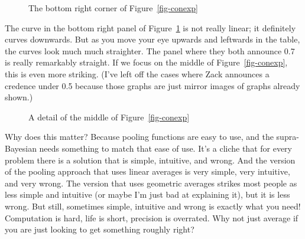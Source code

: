 \documentclass[
  10pt,
  letterpaper,
  DIV=11,
  numbers=noendperiod,
  twoside]{scrartcl}
\begin{document}
\begin{figure}


\caption{\label{fig-cap-bottom-right}The bottom right corner of
Figure~\ref{fig-conexp}}

\end{figure}%

The curve in the bottom right panel of Figure~\ref{fig-cap-bottom-right}
is not really linear; it definitely curves downwards. But as you move
your eye upwards and leftwards in the table, the curves look much much
straighter. The panel where they both announce 0.7 is really remarkably
straight. If we focus on the middle of Figure~\ref{fig-conexp}, this is
even more striking. (I've left off the cases where Zack announces a
credence under 0.5 because those graphs are just mirror images of graphs
already shown.)

\begin{figure}


\caption{\label{fig-cap-middle}A detail of the middle of
Figure~\ref{fig-conexp}}

\end{figure}%

Why does this matter? Because pooling functions are easy to use, and the
supra-Bayesian needs something to match that ease of use. It's a cliche
that for every problem there is a solution that is simple, intuitive,
and wrong. And the version of the pooling approach that uses linear
averages is very simple, very intuitive, and very wrong. The version
that uses geometric averages strikes most people as less simple and
intuitive (or maybe I'm just bad at explaining it), but it is less
wrong. But still, sometimes simple, intuitive and wrong is exactly what
you need! Computation is hard, life is short, precision is overrated.
Why not just average if you are just looking to get something roughly
right?
\end{document}
